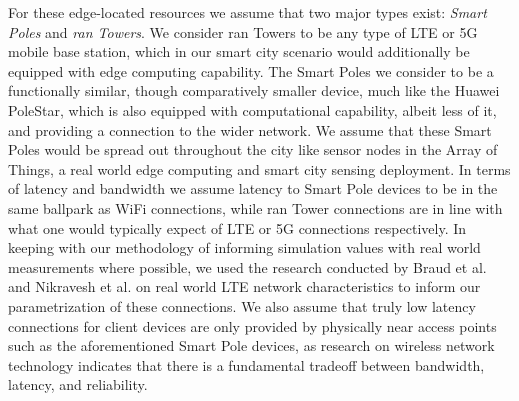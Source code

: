 \documentclass[draft,final]{vutinfth} %
\begin{document}
For these edge-located resources we assume that two major types exist: \textit{Smart Poles} and \textit{\gls{ran} Towers}.
We consider \gls{ran} Towers to be any type of LTE or 5G mobile base station, which in our smart city scenario would additionally be equipped with edge computing capability.
The Smart Poles we consider to be a functionally similar, though comparatively smaller device, much like the Huawei PoleStar\cite{huaweiPolestar}, which is also equipped with computational capability, albeit less of it, and providing a connection to the wider network.
We assume that these Smart Poles would be spread out throughout the city like sensor nodes in the Array of Things\cite{catlettArrayThingsScientific2017a}, a real world edge computing and smart city sensing deployment.
In terms of latency and bandwidth we assume latency to Smart Pole devices to be in the same ballpark as WiFi connections, while \gls{ran} Tower connections are in line with what one would typically expect of LTE or 5G connections respectively.
In keeping with our methodology of informing simulation values with real world measurements where possible, we used the research conducted by Braud et al.\cite{braudMulticarrierMeasurementStudy2019} and Nikravesh et al.\cite{nikraveshMobileNetworkPerformance2014a} on real world LTE network characteristics to inform our parametrization of these connections.
We also assume that truly low latency connections for client devices are only provided by physically near access points such as the aforementioned Smart Pole devices, as research on wireless network technology indicates that there is a fundamental tradeoff between bandwidth, latency, and reliability\cite{soretFundamentalTradeoffsReliability2014}.
\end{document}

